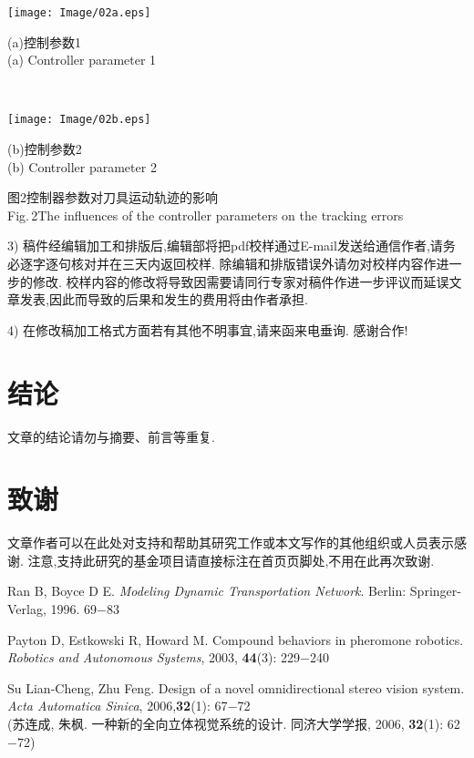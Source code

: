 \documentclass{Style/aas}
\begin{document}
\begin{multicols}{2}%
\begin{center}
{\centerline{\texttt{[image: Image/02a.eps]}}
{\footnotesize (a)控制参数1\\(a) Controller parameter 1}} \\
{\centerline{\texttt{[image: Image/02b.eps]}} {\footnotesize
(b)控制参数2\\(b) Controller parameter 2}} \vskip1mm {\small
图2\quad 控制器参数对刀具运动轨迹的影响
\\Fig.\,2\quad The influences
of the controller parameters on the tracking errors}
\end{center}

3)
稿件经编辑加工和排版后,编辑部将把pdf校样通过E-mail发送给通信作者,请务必逐字逐句核对并在三天内返回校样.
除编辑和排版错误外请勿对校样内容作进一步的修改.
校样内容的修改将导致因需要请同行专家对稿件作进一步评议而延误文章发表,因此而导致的后果和发生的费用将由作者承担.

4) 在修改稿加工格式方面若有其他不明事宜,请来函来电垂询. 感谢合作!

\section{结论}

文章的结论请勿与摘要、前言等重复.

\section*{致谢}

文章作者可以在此处对支持和帮助其研究工作或本文写作的其他组织或人员表示感谢.
注意,支持此研究的基金项目请直接标注在首页页脚处,不用在此再次致谢.

\begin{thebibliography}{99}
 \addtolength{\itemsep}{0.2em} 
 Ran B, Boyce D E. {\sl Modeling Dynamic Transportation Network}.
Berlin: Springer-Verlag, 1996. 69$-$83

 Payton D, Estkowski R, Howard M. Compound behaviors in pheromone robotics. {\sl Robotics and Autonomous Systems}, 2003, {\bf 44}(3): 229$-$240

 Su Lian-Cheng, Zhu Feng. Design of a novel omnidirectional stereo vision system. {\sl  Acta Automatica Sinica}, 2006,{\bf 32}(1): 67$-$72\\ (苏连成, 朱枫. 一种新的全向立体视觉系统的设计. 同济大学学报, 2006, {\bf 32}(1): 62$-$72)


\end{thebibliography}
\end{multicols}
\end{document}
